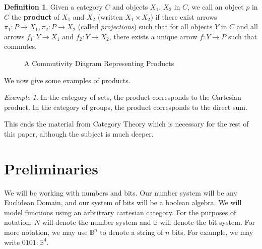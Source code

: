 \documentclass[14pt]{extarticle}  %
\theoremstyle{plain}
\theoremstyle{definition}
\newtheorem{defn}[thm]{Definition}
\theoremstyle{remark}
\newtheorem*{ex}{Example}
\begin{document}
\begin{defn}
  Given a category $C$ and objects $X_{1}$, $X_{2}$ in $C$, we call an object $p$ in $C$ the \textbf{product} of $X_{1}$ and $X_{2}$ (written $X_{1} \times X_{2}$) if there exist arrows
  $\pi_{1} : P \to X_{1}, \pi_{2} : P \to X_{2}$ (called \textit{projections}) such that for all objects $Y$ in $C$ and all arrows $f_{1} : Y \to X_{1}$ and $f_{2} : Y \to X_{2}$, there exists a unique arrow
  $f : Y \to P$ such that  commutes.


  \begin{figure}
\centering
\caption{A Commutivity Diagram Representing Products}
\label{fig:prods}
\end{figure}

We now give some examples of products.
\begin{ex}
  In the category of sets, the product corresponds to the Cartesian product. In the category of groups, the product corresponds to the direct sum.
\end{ex}

This ends the material from Category Theory which is necessary for the rest of this paper, although the subject is much deeper.


\end{defn}
\section{Preliminaries}
We will be working with numbers and bits. Our number system will be any Euclidean Domain, and our system of bits will be a boolean algebra.
We will model functions using an arbtitrary cartesian category. For the purposes of notation, $N$ will denote the number system and $\mathbb{B}$ will denote
the bit system. For more notation, we may use $\mathbb{B}^{n}$ to denote a string of $n$ bits. For example, we may write $0101 : \mathbb{B}^{4}$.
\end{document}
